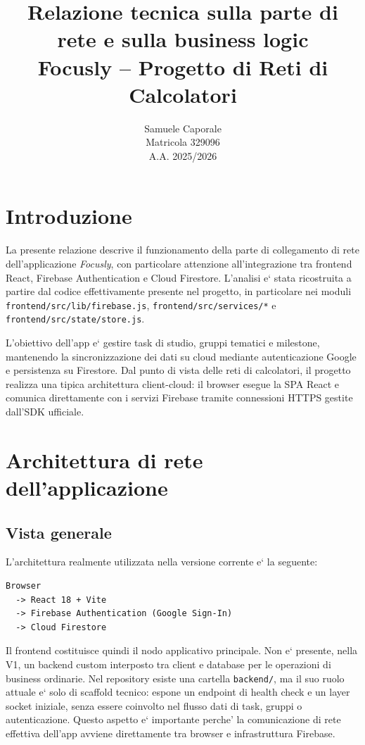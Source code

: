 \documentclass[11pt,a4paper]{article}
\title{\textbf{Relazione tecnica sulla parte di rete e sulla business logic}\\
\large Focusly -- Progetto di Reti di Calcolatori}
\author{Samuele Caporale \\ Matricola 329096 \\ A.A. 2025/2026}
\date{}
\begin{document}
\maketitle
\tableofcontents
\bigskip

\section{Introduzione}

La presente relazione descrive il funzionamento della parte di collegamento di rete dell'applicazione \emph{Focusly}, con particolare attenzione all'integrazione tra frontend React, Firebase Authentication e Cloud Firestore. L'analisi e` stata ricostruita a partire dal codice effettivamente presente nel progetto, in particolare nei moduli \texttt{frontend/src/lib/firebase.js}, \texttt{frontend/src/services/*} e \texttt{frontend/src/state/store.js}.

L'obiettivo dell'app e` gestire task di studio, gruppi tematici e milestone, mantenendo la sincronizzazione dei dati su cloud mediante autenticazione Google e persistenza su Firestore. Dal punto di vista delle reti di calcolatori, il progetto realizza una tipica architettura client-cloud: il browser esegue la SPA React e comunica direttamente con i servizi Firebase tramite connessioni HTTPS gestite dall'SDK ufficiale.

\section{Architettura di rete dell'applicazione}

\subsection{Vista generale}

L'architettura realmente utilizzata nella versione corrente e` la seguente:

\begin{lstlisting}
Browser
  -> React 18 + Vite
  -> Firebase Authentication (Google Sign-In)
  -> Cloud Firestore
\end{lstlisting}

Il frontend costituisce quindi il nodo applicativo principale. Non e` presente, nella V1, un backend custom interposto tra client e database per le operazioni di business ordinarie. Nel repository esiste una cartella \texttt{backend/}, ma il suo ruolo attuale e` solo di scaffold tecnico: espone un endpoint di health check e un layer socket iniziale, senza essere coinvolto nel flusso dati di task, gruppi o autenticazione. Questo aspetto e` importante perche' la comunicazione di rete effettiva dell'app avviene direttamente tra browser e infrastruttura Firebase.
\end{document}

